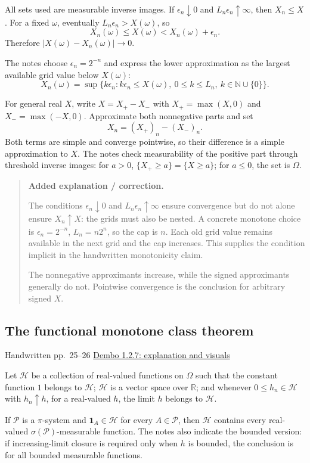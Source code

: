 \documentclass[11pt,letterpaper]{article}
\newcommand{\lecturesection}[1]{\subsection{#1}}
\begin{document}
All sets used are measurable inverse images. If $\epsilon_n\downarrow0$ and $L_n\epsilon_n\uparrow\infty$, then $X_n\le X$. For a fixed $\omega$, eventually $L_n\epsilon_n>X(\omega)$, so \[X_n(\omega)\le X(\omega)<X_n(\omega)+\epsilon_n.\] Therefore $|X(\omega)-X_n(\omega)|\to0$.

The notes choose $\epsilon_n=2^{-n}$ and express the lower approximation as the largest available grid value below $X(\omega)$: \[X_n(\omega)=\sup\{k\epsilon_n:k\epsilon_n\le X(\omega),\ 0\le k\le L_n,\ k\in\mathbb N\cup\{0\}\}.\]

For general real $X$, write $X=X_+-X_-$ with $X_+=\max(X,0)$ and $X_-=\max(-X,0)$. Approximate both nonnegative parts and set \[X_n=(X_+)_n-(X_-)_n.\] Both terms are simple and converge pointwise, so their difference is a simple approximation to $X$. The notes check measurability of the positive part through threshold inverse images: for $a>0$, $\{X_+\ge a\}=\{X\ge a\}$; for $a\le0$, the set is $\Omega$.

\begin{quote}\small\textbf{Added explanation / correction.}

The conditions $\epsilon_n\downarrow0$ and $L_n\epsilon_n\uparrow\infty$ ensure convergence but do not alone ensure $X_n\uparrow X$: the grids must also be nested. A concrete monotone choice is $\epsilon_n=2^{-n}$, $L_n=n2^n$, so the cap is $n$. Each old grid value remains available in the next grid and the cap increases. This supplies the condition implicit in the handwritten monotonicity claim.

The nonnegative approximants increase, while the signed approximants generally do not. Pointwise convergence is the conclusion for arbitrary signed $X$.
\end{quote}

\hypertarget{l3-s6}{}
\lecturesection{The functional monotone class theorem}
{\small\textcolor{lectureink}{Handwritten pp.\ 25--26} \quad \href{https://josephrbailey.com/probability/\#entry-1-2-7}{Dembo 1.2.7: explanation and visuals}}

Let $\mathcal H$ be a collection of real-valued functions on $\Omega$ such that the constant function $1$ belongs to $\mathcal H$; $\mathcal H$ is a vector space over $\mathbb R$; and whenever $0\le h_n\in\mathcal H$ with $h_n\uparrow h$, for a real-valued $h$, the limit $h$ belongs to $\mathcal H$.

If $\mathcal P$ is a $\pi$-system and $\mathbf1_A\in\mathcal H$ for every $A\in\mathcal P$, then $\mathcal H$ contains every real-valued $\sigma(\mathcal P)$-measurable function. The notes also indicate the bounded version: if increasing-limit closure is required only when $h$ is bounded, the conclusion is for all bounded measurable functions.
\end{document}
